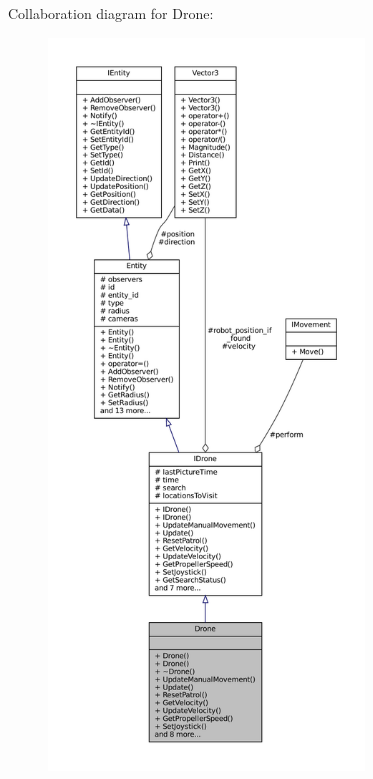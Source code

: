 Collaboration diagram for Drone\+:\nopagebreak
\begin{figure}[H]
\begin{center}
\leavevmode
\includegraphics[height=550pt]{classDrone__coll__graph}
\end{center}
\end{figure}
